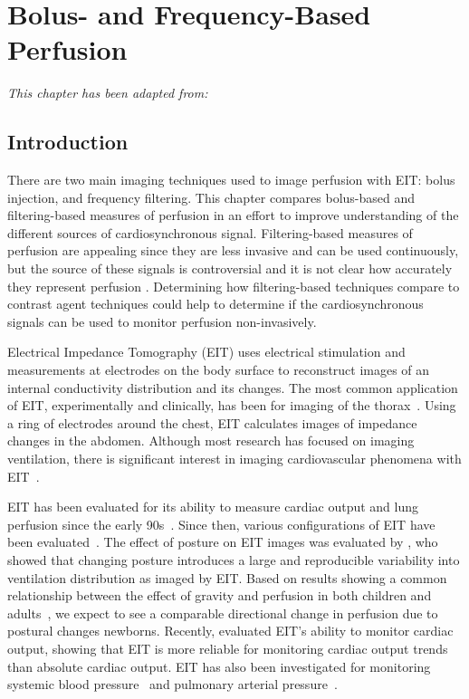 \chapter{Bolus- and Frequency-Based Perfusion}
\label{chap:chapter-3}

\emph{This chapter has been adapted from: \\ 
}

\section{Introduction}

There are two main imaging techniques used to image perfusion with EIT: bolus injection, and frequency
filtering. This chapter compares bolus-based and filtering-based measures of perfusion 
in an effort to improve understanding of the different sources of cardiosynchronous signal. 
Filtering-based measures of perfusion are appealing 
since they are less invasive and can be used continuously, but the source of these signals 
is controversial and it is not clear how accurately they represent perfusion
\parencite{adler_origins_2017}. Determining how filtering-based techniques compare to contrast 
agent techniques could help to determine if the cardiosynchronous signals can be used 
to monitor perfusion non-invasively. 

Electrical Impedance Tomography (EIT) uses 
electrical stimulation and measurements at electrodes on the
body surface to reconstruct images of an internal conductivity
distribution and its changes.
The most common application of EIT, experimentally and clinically,
has been for imaging of the thorax~\parencite{frerichs_chest_2017}.
Using a ring of electrodes around the chest, EIT calculates
images of impedance changes in the abdomen.
Although most research has focused on
imaging ventilation, there is significant interest in imaging
cardiovascular phenomena with EIT~\parencite{adler_whither_2012,leonhardt_electrical_2012}. 

EIT has been evaluated for its ability to measure cardiac output and
lung perfusion since the early 90s~\parencite{eyuboglu_vivo_1989,zadehkoochak_pulmonary_1992,frerichs_regional_2002}.
Since then, various configurations of EIT have been evaluated~\parencite{borges_regional_2012,nguyen_perfusion_2015}.
The effect of posture on EIT images
was evaluated by , 
who showed that changing posture
introduces a large and reproducible variability into ventilation 
distribution as imaged by EIT.
Based on results showing a common relationship between the 
effect of gravity and perfusion in both children and
adults~\parencite{bhuyan_effects_1989},
we expect to see a comparable directional change in perfusion due to postural changes
newborns.
Recently,  evaluated EIT's ability to monitor
cardiac output, showing that EIT is more reliable for monitoring
cardiac output trends than absolute cardiac output.
EIT has also been investigated for
monitoring systemic blood pressure~\parencite{sola_non-invasive_2011} and 
pulmonary arterial pressure~\parencite{proenca_noninvasive_2017}.

